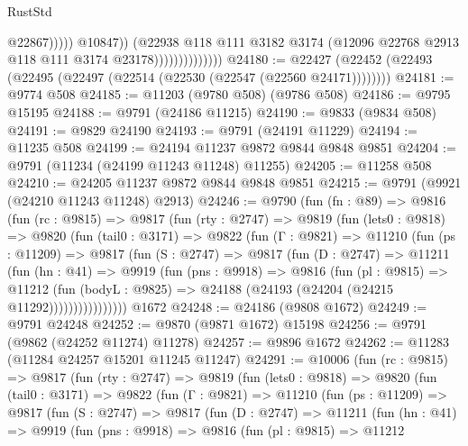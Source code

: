 \begin{lexlean}{RustStd}
\begin{coremodule}
                                          @22867)))))
                                @10847))
                            (@22938
                              @118
                              @111
                              @3182
                              @3174
                              (@12096 @22768 @2913 @118 @111 @3174 @23178))))))))))))))
@24180 := @22427 (@22452 (@22493 (@22495 (@22497 (@22514 (@22530 (@22547 (@22560 @24171))))))))
@24181 := @9774 @508
@24185 := @11203 (@9780 @508) (@9786 @508)
@24186 := @9795 @15195
@24188 := @9791 (@24186 @11215)
@24190 := @9833 (@9834 @508)
@24191 := @9829 @24190
@24193 := @9791 (@24191 @11229)
@24194 := @11235 @508
@24199 := @24194 @11237 @9872 @9844 @9848 @9851
@24204 := @9791 (@11234 (@24199 @11243 @11248) @11255)
@24205 := @11258 @508
@24210 := @24205 @11237 @9872 @9844 @9848 @9851
@24215 := @9791 (@9921 (@24210 @11243 @11248) @2913)
@24246 := @9790
    (fun (fn : @89) =>
    @9816
      (fun (rc : @9815) =>
      @9817
        (fun (rty : @2747) =>
        @9819
          (fun (lets0 : @9818) =>
          @9820
            (fun (tail0 : @3171) =>
            @9822
              (fun (Γ : @9821) =>
              @11210
                (fun (ps : @11209) =>
                @9817
                  (fun (S : @2747) =>
                  @9817
                    (fun (D : @2747) =>
                    @11211
                      (fun (hn : @41) =>
                      @9919
                        (fun (pns : @9918) =>
                        @9816
                          (fun (pl : @9815) =>
                          @11212
                            (fun (bodyL : @9825) =>
                            @24188 (@24193 (@24204 (@24215 @11292))))))))))))))))
    @1672
@24248 := @24186 (@9808 @1672)
@24249 := @9791 @24248
@24252 := @9870 (@9871 @1672) @15198
@24256 := @9791 (@9862 (@24252 @11274) @11278)
@24257 := @9896 @1672
@24262 := @11283 (@11284 @24257 @15201 @11245 @11247)
@24291 := @10006
    (fun (rc : @9815) =>
    @9817
      (fun (rty : @2747) =>
      @9819
        (fun (lets0 : @9818) =>
        @9820
          (fun (tail0 : @3171) =>
          @9822
            (fun (Γ : @9821) =>
            @11210
              (fun (ps : @11209) =>
              @9817
                (fun (S : @2747) =>
                @9817
                  (fun (D : @2747) =>
                  @11211
                    (fun (hn : @41) =>
                    @9919
                      (fun (pns : @9918) =>
                      @9816
                        (fun (pl : @9815) =>
                        @11212

\end{coremodule}
\end{lexlean}
